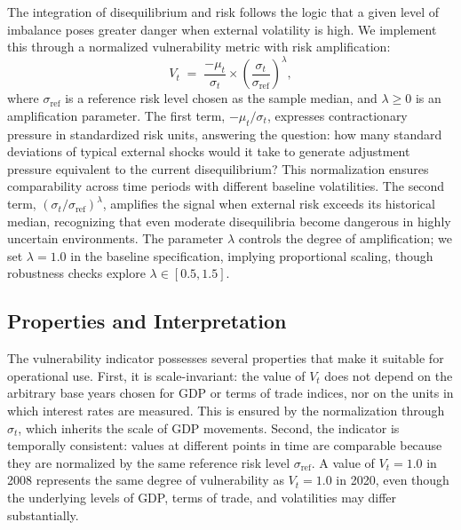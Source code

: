 \documentclass[12pt,a4paper]{article}
\numberwithin{equation}{section}
\theoremstyle{definition}
\theoremstyle{remark}
\begin{document}
The integration of disequilibrium and risk follows the logic that a given level of imbalance poses greater danger when external volatility is high. We implement this through a normalized vulnerability metric with risk amplification:
\begin{equation}
\label{eq:vulnerability_final}
V_t \;=\; \frac{-\mu_t}{\sigma_t} \times \left(\frac{\sigma_t}{\sigma_{\text{ref}}}\right)^\lambda,
\end{equation}
where $\sigma_{\text{ref}}$ is a reference risk level chosen as the sample median, and $\lambda \geq 0$ is an amplification parameter. The first term, $-\mu_t/\sigma_t$, expresses contractionary pressure in standardized risk units, answering the question: how many standard deviations of typical external shocks would it take to generate adjustment pressure equivalent to the current disequilibrium? This normalization ensures comparability across time periods with different baseline volatilities. The second term, $(\sigma_t/\sigma_{\text{ref}})^\lambda$, amplifies the signal when external risk exceeds its historical median, recognizing that even moderate disequilibria become dangerous in highly uncertain environments. The parameter $\lambda$ controls the degree of amplification; we set $\lambda=1.0$ in the baseline specification, implying proportional scaling, though robustness checks explore $\lambda \in [0.5, 1.5]$.


\subsection{Properties and Interpretation}

The vulnerability indicator possesses several properties that make it suitable for operational use. First, it is scale-invariant: the value of $V_t$ does not depend on the arbitrary base years chosen for GDP or terms of trade indices, nor on the units in which interest rates are measured. This is ensured by the normalization through $\sigma_t$, which inherits the scale of GDP movements. Second, the indicator is temporally consistent: values at different points in time are comparable because they are normalized by the same reference risk level $\sigma_{\text{ref}}$. A value of $V_t = 1.0$ in 2008 represents the same degree of vulnerability as $V_t = 1.0$ in 2020, even though the underlying levels of GDP, terms of trade, and volatilities may differ substantially.
\end{document}
